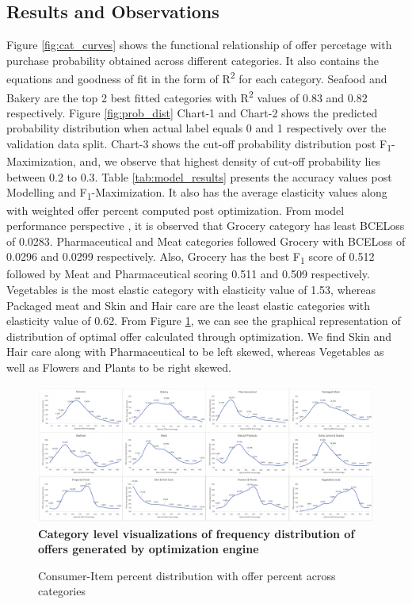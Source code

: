 \subsection{Results and Observations}
Figure \ref{fig:cat_curves} shows the functional relationship of offer percetage with purchase probability 
obtained across different categories. It also contains the equations and goodness of fit in the 
form of R\textsuperscript{2} for each category. Seafood and Bakery are the top 2 best fitted categories
with R\textsuperscript{2} values of 0.83 and 0.82 respectively. Figure \ref{fig:prob_dist} Chart-1 and Chart-2 shows the 
predicted probability distribution when actual label equals 0 and 1 respectively over the validation data split.
Chart-3 shows the cut-off probability distribution post F\textsubscript{1}-Maximization, and, we observe 
that highest density of cut-off probability lies between 0.2 to 0.3. Table \ref{tab:model_results} presents the 
accuracy values post Modelling and F\textsubscript{1}-Maximization. It also has the average elasticity values 
along with weighted offer percent computed post optimization. From model performance perspective
, it is observed that Grocery category has least BCELoss of 0.0283. Pharmaceutical and Meat categories
followed Grocery with BCELoss of 0.0296 and 0.0299 respectively. Also, Grocery has the best
F\textsubscript{1} score of 0.512 followed by Meat and Pharmaceutical scoring 0.511 and 0.509
respectively. Vegetables is the most elastic category with elasticity value of 1.53, whereas 
Packaged meat and Skin and Hair care are the least elastic categories with elasticity value of 0.62.
From Figure \ref{fig:optimize}, we can see the graphical representation of distribution of 
optimal offer calculated through optimization. We find Skin and Hair care along with Pharmaceutical to be 
left skewed, whereas Vegetables as well as Flowers and Plants to be right skewed.
 \begin{figure}[hbt!]
    \centering 
    \caption{Consumer-Item percent distribution with offer percent across categories}
    \includegraphics[width=5.5in]{img/optimize.png} 
    \\ {\scriptsize \bf Category level visualizations of frequency distribution of offers generated by
    optimization engine}
    \label{fig:optimize} 
  \end{figure}

